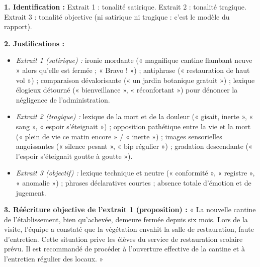 \documentclass[11pt]{article}
\newcommand{\cle}[1]{{\popxbold\color{popdark}#1}}
\begin{document}
\begin{corrige}
\textbf{1. Identification :} Extrait 1 : tonalité \cle{satirique}. Extrait 2 : tonalité \cle{tragique}. Extrait 3 : tonalité \cle{objective} (ni satirique ni tragique : c'est le modèle du rapport).

\textbf{2. Justifications :}
\begin{itemize}
    \item \emph{Extrait 1 (satirique) :} ironie mordante (« magnifique cantine flambant neuve » alors qu'elle est fermée ; « Bravo ! ») ; antiphrase (« restauration de haut vol ») ; comparaison dévalorisante (« un jardin botanique gratuit ») ; lexique élogieux détourné (« bienveillance », « réconfortant ») pour dénoncer la négligence de l'administration.
    \item \emph{Extrait 2 (tragique) :} lexique de la mort et de la douleur (« gisait, inerte », « sang », « espoir s'éteignait ») ; opposition pathétique entre la vie et la mort (« plein de vie ce matin encore » / « inerte ») ; images sensorielles angoissantes (« silence pesant », « bip régulier ») ; gradation descendante (« l'espoir s'éteignait goutte à goutte »).
    \item \emph{Extrait 3 (objectif) :} lexique technique et neutre (« conformité », « registre », « anomalie ») ; phrases déclaratives courtes ; absence totale d'émotion et de jugement.
\end{itemize}
\textbf{3. Réécriture objective de l'extrait 1 (proposition) :}
« La nouvelle cantine de l'établissement, bien qu'achevée, demeure fermée depuis six mois. Lors de la visite, l'équipe a constaté que la végétation envahit la salle de restauration, faute d'entretien. Cette situation prive les élèves du service de restauration scolaire prévu. Il est recommandé de procéder à l'ouverture effective de la cantine et à l'entretien régulier des locaux. »
\end{corrige}
\end{document}
